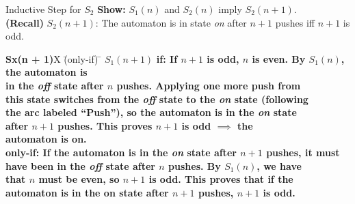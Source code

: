 \documentclass[style=sailor,size=12pt]{powerdot}
\begin{document}
\begin{wideslide}[bm=,toc=]{Inductive Step for $S_2$}
{\bf Show:} $S_1(n)$ and $S_2(n)$ imply $S_2(n + 1)$.\\
{\bf (Recall)} $S_2(n+1)$: The automaton is in state \emph{on} after $n + 1$
pushes iff $n+1$ is odd.  
\begin{tabbing}
{\bf Sx(n + 1)}X \=  (only-if) \= \kill
{\bf $S_1(n + 1)$}  \>
           \bf{if:} \> 
           If $n + 1$ is odd, $n$ is even. By $S_1(n)$, the automaton is \\
      \>\> in the \emph{off} state after $n$ pushes. Applying one more push from \\
      \>\> this state switches from the \emph{off} state to the \emph{on} state (following \\
      \>\> the arc labeled ``Push''), so the automaton is in the \emph{on} state \\
      \>\> after $n + 1$ pushes. This proves $n + 1$ is odd $\implies$ the \\
      \>\> automaton is on.
           \\[2ex]
      \>
     \bf{only-if:}\> 
           If the automaton is in the \emph{on} state after $n + 1$ pushes, it must \\
      \>\> have been in the \emph{off} state after $n$ pushes. By $S_1(n)$, we have\\
      \>\> that $n$ must be even, so $n+1$ is odd. This proves that if the \\
      \>\> automaton is in the on state after $n + 1$ pushes, $n+1$ is odd. 
           \\[2ex]
\end{tabbing}


\end{wideslide}
\end{document}
